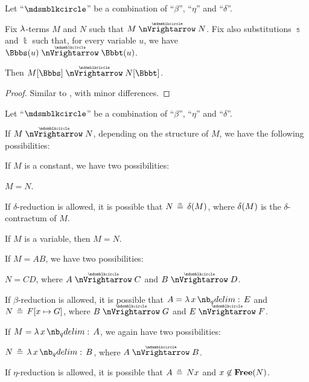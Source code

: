 \begin{proposition}\label{thm:substitution_on_parallel_reduction}
  Let \enquote{\( {\Anon} \)} be a combination of \enquote{\( \beta \)}, \enquote{\( \eta \)} and \enquote{\( \delta \)}.

  Fix \( \mathrm{\lambda} \)-terms \( M \) and \( N \) such that \( M \ppred N \). Fix also substitutions \( \Bbbs \) and \( \Bbbt \) such that, for every variable \( u \), we have \( \Bbbs(u) \ppred \Bbbt(u) \).

  Then \( M[\Bbbs] \ppred N[\Bbbt] \).
\end{proposition}
\begin{proof}
  Similar to , with minor differences.
\end{proof}

\begin{lemma}\label{thm:parallel_reduction_deconstruction}
  Let \enquote{\( {\Anon} \)} be a combination of \enquote{\( \beta \)}, \enquote{\( \eta \)} and \enquote{\( \delta \)}.

  If \( M \ppred N \), depending on the structure of \( M \), we have the following possibilities:
  \begin{thmenum}
     If \( M \) is a constant, we have two possibilities:
    \begin{thmenum}
       \( M = N \).

       If \( \delta \)-reduction is allowed, it is possible that \( N \aequiv \op*{\delta}(M) \), where \( \op*{\delta}(M) \) is the \( \delta \)-contractum  of \( M \).
    \end{thmenum}

     If \( M \) is a variable, then \( M = N \).

     If \( M = AB \), we have two possibilities:
    \begin{thmenum}
       \( N = CD \), where \( A \ppred C \) and \( B \ppred D \).

       If \( \beta \)-reduction is allowed, it is possible that \( A = \qabs x E \) and \( N \aequiv F[x \mapsto G] \), where \( B \ppred G \) and \( E \ppred F \).
    \end{thmenum}

     If \( M = \qabs x A \), we again have two possibilities:
    \begin{thmenum}
       \( N \aequiv \qabs x B \), where \( A \ppred B \).

       If \( \eta \)-reduction is allowed, it is possible that \( A \aequiv Nx \) and \( x \not\in \op*{Free}(N) \).
    \end{thmenum}
  \end{thmenum}
\end{lemma}
